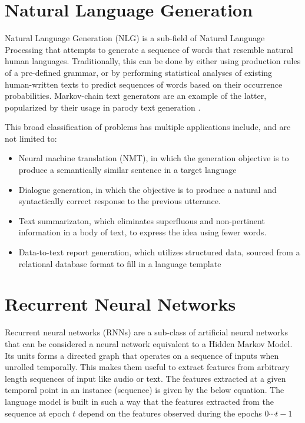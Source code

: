 \section{Natural Language Generation}

Natural Language Generation (NLG) is a sub-field of Natural Language Processing that attempts to generate a sequence of words that resemble natural human languages. Traditionally, this can be done by either using production rules of a pre-defined grammar, or by performing statistical analyses of existing human-written texts to predict sequences of words based on their occurrence probabilities. Markov-chain text generators are an example of the latter, popularized by their usage in parody text generation \cite{jelinek1985markov}.

This broad classification of problems has multiple applications include, and are not limited to:
\begin{itemize}
	\item Neural machine translation (NMT), in which the generation objective is to produce a semantically similar sentence in a target language
	\item Dialogue generation, in which the objective is to produce a natural and syntactically correct response to the previous utterance.
	\item Text summarizaton, which eliminates superfluous and non-pertinent information in a body of text, to express the idea using fewer words.
	\item Data-to-text report generation, which utilizes structured data, sourced from a relational database format to fill in a language template
\end{itemize}

\section{Recurrent Neural Networks}

Recurrent neural networks (RNNs) are a sub-class of artificial neural networks that can be considered a neural network equivalent to a Hidden Markov Model. Its units forms a directed graph that operates on a sequence of inputs when unrolled temporally. This makes them useful to extract features from arbitrary length sequences of input like audio or text. The features extracted at a given temporal point in an instance (sequence) is given by the below equation. The language model is built in such a way that the features extracted from the sequence at epoch $t$ depend on the features observed during the epochs $0 \cdots t-1$

